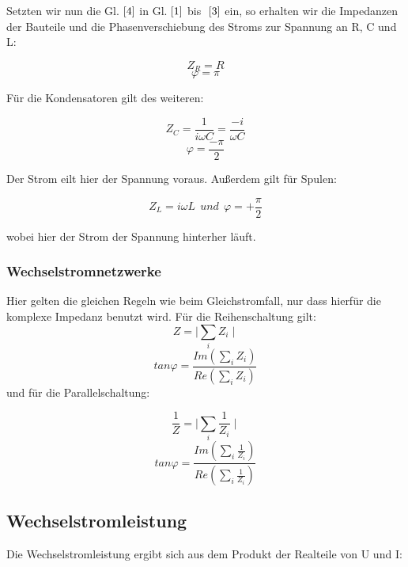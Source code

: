 Setzten wir nun die Gl.\(\ \eqref{4}\) in Gl.\(\ \eqref{1}\) bis \(\ \eqref{3}\) ein, so erhalten wir die Impedanzen der Bauteile und die Phasenverschiebung des Stroms zur Spannung an R, C und L:

\begin{equation}
Z_{R}=R
\end{equation}
\begin{equation}
\varphi = \pi
\end{equation}

Für die Kondensatoren gilt des weiteren:

\begin{equation}
Z_{C}=\frac{1}{i \omega C} = \frac{-i}{\omega C}
\end{equation}
\begin{equation}
\varphi=\frac{-\pi }{2}
\end{equation}

Der Strom eilt hier der Spannung voraus. Außerdem gilt für Spulen:

\begin{equation}
Z_{L}= i \omega L\ \ und \ \ \varphi =+\frac{\pi }{2}
\end{equation}

wobei hier der Strom der Spannung hinterher läuft.

\subsubsection{Wechselstromnetzwerke}
Hier gelten die gleichen Regeln wie beim Gleichstromfall, nur dass hierfür die komplexe Impedanz benutzt wird.
Für die Reihenschaltung gilt:
\begin{equation}
Z=\mid{ \sum \limits_{i} Z_i} \mid
\end{equation}
\begin{equation}
tan \varphi ={\frac{Im \left( \sum \limits_{i} Z_{i} \right) }{Re \left( \sum \limits_{i} Z_{i} \right) }}
\end{equation}
und für die Parallelschaltung:

\begin{equation}
\frac{1}{Z}=\mid{ \sum \limits_{i} \frac{1}{Z_{i}}}\mid 
\end{equation}
\begin{equation}
tan\varphi = {\frac{Im \left( {\sum\limits_{i}{\frac{1}{Z_i}}} \right) }{Re \left( {\sum\limits_{i}{\frac{1}{Z_i}}}\right) }}
\end{equation}

\subsection{Wechselstromleistung}
Die Wechselstromleistung ergibt sich aus dem Produkt der Realteile von U und I:

